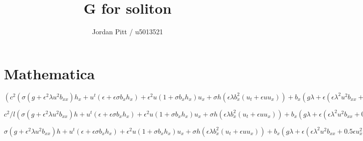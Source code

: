 \documentclass[12pt]{article}
\begin{document}
\title{G for soliton}
\author{Jordan Pitt / u5013521}

\section{Mathematica}

$ (c^2  (\sigma (g + \epsilon^2  \lambda u^2  b_{xx}) h_x + u^{t}(\epsilon + \epsilon \sigma b_x h_x) + \epsilon^2 u (1 + \sigma b_x h_x) u_x +
\sigma h (\epsilon \lambda b_x^2 (u_t + \epsilon u u_x))
+ b_x (g \lambda + \epsilon(\epsilon \lambda^2 u^2 b_{xx} + 0.5\epsilon u_x^2
+ 0.5 u_{xt} + 0.5 \epsilon u u_{xx} ))
+ \epsilon (( 0.5 \epsilon \lambda^2 u^2 b_{xxx} + 0.5 \lambda b_{xx} u_t
+ \sigma h_{x} ( \epsilon u_{x}^2 - u{x,t}) + \epsilon u (1.5 \lambda b_{xx} u_{x} - s h_x u_{xx} )))
+ \epsilon \sigma^2 h^2 ( \frac{1}{3} \epsilon u_{x}u_{xx}
+ \lambda b_x ( 0.5 \epsilon u_x^2 - 0.5 u_{xt} - 0.5 \epsilon u u_{xx})
- \frac{1}{3} u_{xxt} - \frac{1}{3} \epsilon u u_{xxx}))) / l = 0
$ 

$ c^2/l  (\sigma (g + \epsilon^2  \lambda u^2  b_{xx}) h + u^{t}(\epsilon + \epsilon \sigma b_x h_x) + \epsilon^2 u (1 + \sigma b_x h_x) u_x +
\sigma h (\epsilon \lambda b_x^2 (u_t + \epsilon u u_x))
+ b_x (g \lambda + \epsilon(\epsilon \lambda^2 u^2 b_{xx} + 0.5\epsilon u_x^2
+ 0.5 u_{xt} + 0.5 \epsilon u u_{xx} ))
+ \epsilon (( 0.5 \epsilon \lambda^2 u^2 b_{xxx} + 0.5 \lambda b_{xx} u_t
+ \sigma h_{x} ( \epsilon u_{x}^2 - u{x,t}) + \epsilon u (1.5 \lambda b_{xx} u_{x} - s h_x u_{xx} )))
+ \epsilon \sigma^2 h^2 ( \frac{1}{3} \epsilon u_{x}u_{xx}
+ \lambda b_x ( 0.5 \epsilon u_x^2 - 0.5 u_{xt} - 0.5 \epsilon u u_{xx})
- \frac{1}{3} u_{xxt} - \frac{1}{3} \epsilon u u_{xxx})) = 0
$

$\sigma (g + \epsilon^2  \lambda u^2  b_{xx}) h + u^{t}(\epsilon + \epsilon \sigma b_x h_x) + \epsilon^2 u (1 + \sigma b_x h_x) u_x +
\sigma h (\epsilon \lambda b_x^2 (u_t + \epsilon u u_x))
+ b_x (g \lambda + \epsilon(\epsilon \lambda^2 u^2 b_{xx} + 0.5\epsilon u_x^2
+ 0.5 u_{xt} + 0.5 \epsilon u u_{xx} ))
+ \epsilon (( 0.5 \epsilon \lambda^2 u^2 b_{xxx} + 0.5 \lambda b_{xx} u_t
+ \sigma h_{x} ( \epsilon u_{x}^2 - u{x,t}) + \epsilon u (1.5 \lambda b_{xx} u_{x} - s h_x u_{xx} )))
+ \epsilon \sigma^2 h^2 ( \frac{1}{3} \epsilon u_{x}u_{xx}
+ \lambda b_x ( 0.5 \epsilon u_x^2 - 0.5 u_{xt} - 0.5 \epsilon u u_{xx})
- \frac{1}{3} u_{xxt} - \frac{1}{3} \epsilon u u_{xxx}) = 0
$
\end{document}
